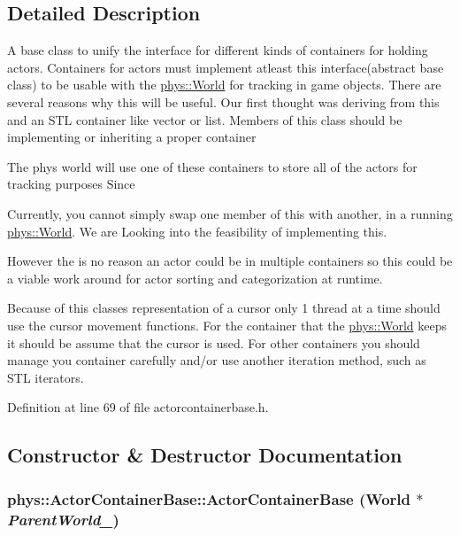 \subsection{Detailed Description}
A base class to unify the interface for different kinds of containers for holding actors. Containers for actors must implement atleast this interface(abstract base class) to be usable with the \hyperlink{classphys_1_1World}{phys::World} for tracking in game objects. There are several reasons why this will be useful. Our first thought was deriving from this and an STL container like vector or list. Members of this class should be implementing or inheriting a proper container\par
\par
 The phys world will use one of these containers to store all of the actors for tracking purposes Since \par
\par
 Currently, you cannot simply swap one member of this with another, in a running \hyperlink{classphys_1_1World}{phys::World}. We are Looking into the feasibility of implementing this. \par
\par
 However the is no reason an actor could be in multiple containers so this could be a viable work around for actor sorting and categorization at runtime. \par
\par
 Because of this classes representation of a cursor only 1 thread at a time should use the cursor movement functions. For the container that the \hyperlink{classphys_1_1World}{phys::World} keeps it should be assume that the cursor is used. For other containers you should manage you container carefully and/or use another iteration method, such as STL iterators. 

Definition at line 69 of file actorcontainerbase.h.



\subsection{Constructor \& Destructor Documentation}
\hypertarget{classphys_1_1ActorContainerBase_a629529f9002646d463ea167af1d20df2}{
\subsubsection[{ActorContainerBase}]{\setlength{\rightskip}{0pt plus 5cm}phys::ActorContainerBase::ActorContainerBase ({\bf World} $\ast$ {\em ParentWorld\_\-})}}
\label{d1/d00/classphys_1_1ActorContainerBase_a629529f9002646d463ea167af1d20df2}


